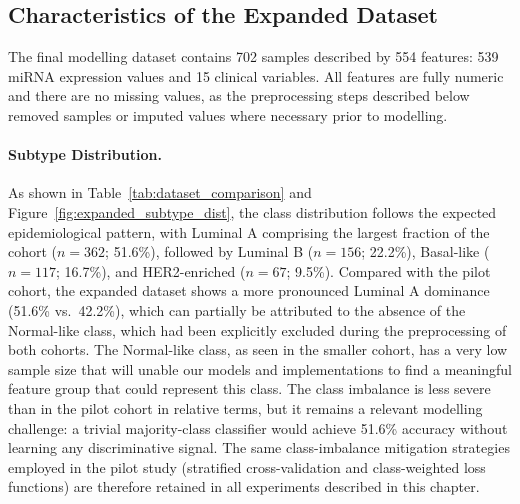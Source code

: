 \subsection*{Characteristics of the Expanded Dataset}

The final modelling dataset contains 702 samples described by 554 features: 539
miRNA expression values and 15 clinical variables. All features are fully numeric
and there are no missing values, as the preprocessing steps described below
removed samples or imputed values where necessary prior to modelling.

\paragraph{Subtype Distribution.}
As shown in Table~\ref{tab:dataset_comparison} and Figure~\ref{fig:expanded_subtype_dist},
the class distribution follows the expected epidemiological pattern, with Luminal A
comprising the largest fraction of the cohort ($n = 362$; 51.6\%), followed by
Luminal B ($n = 156$; 22.2\%), Basal-like ($n = 117$; 16.7\%), and HER2-enriched
($n = 67$; 9.5\%). Compared with the pilot cohort, the expanded dataset shows a
more pronounced Luminal A dominance (51.6\% vs.\ 42.2\%), which can partially
be attributed to the absence of the Normal-like class, which had been explicitly
excluded during the preprocessing of both cohorts. The Normal-like class, as seen 
in the smaller cohort, has a very low sample size that will unable our models and 
implementations to find a meaningful feature group that could represent this class.  
The class imbalance is less severe than in the pilot cohort in relative terms, but
it remains a relevant modelling challenge: a trivial majority-class classifier
would achieve 51.6\% accuracy without learning any discriminative signal. The same
class-imbalance mitigation strategies employed in the pilot study (stratified
cross-validation and class-weighted loss functions) are therefore retained in all
experiments described in this chapter.

